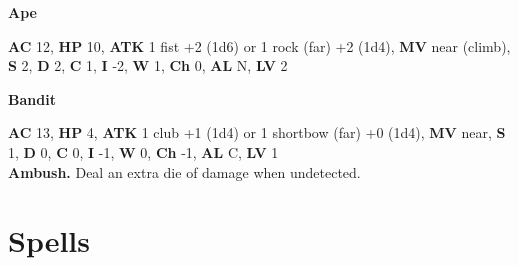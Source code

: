 \documentclass[
  10pt,
  titlepage=firstiscover,
  toc=flat,
  twoside]{scrreprt}
\begin{document}
{\raggedcolumns\begin{multicols}{2}

\textbf{Ape}

\textbf{AC} 12, \textbf{HP} 10, \textbf{ATK} 1 fist +2 (1d6) or 1 rock (far) +2 (1d4), \textbf{MV} near (climb), \textbf{S} 2, \textbf{D} 2, \textbf{C} 1, \textbf{I} -2, \textbf{W} 1, \textbf{Ch} 0, \textbf{AL} N, \textbf{LV} 2\\

\columnbreak

\textbf{Bandit}

\textbf{AC} 13, \textbf{HP} 4, \textbf{ATK} 1 club +1 (1d4) or 1 shortbow (far) +0 (1d4), \textbf{MV} near, \textbf{S} 1, \textbf{D} 0, \textbf{C} 0, \textbf{I} -1, \textbf{W} 0, \textbf{Ch} -1, \textbf{AL} C, \textbf{LV} 1\\
\textbf{Ambush. }Deal an extra die of damage when undetected.

\end{multicols}
}

\chapter{Spells}\label{spells}
\end{document}
